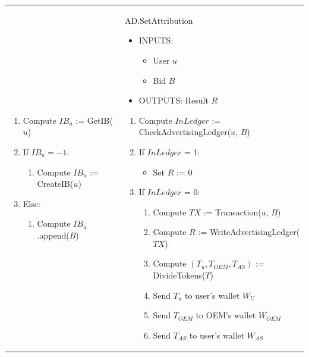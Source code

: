 \begin{table}[H]
\begin{tabular}{|p{}p{}|}
\begin{enumerate}
\begin{enumerate}
		\item Compute $IB_u$ := \textsf{GetIB}($u$)
		\item If $IB_u = -1$: 
		\begin{enumerate}
			\item Compute $IB_u$ := \textsf{CreateIB}($u$)
		\end{enumerate}
		\item Else:
		\begin{enumerate}
		 \item Compute $IB_u$.\textsf{append}($B$)
		\end{enumerate}
	\end{enumerate}
\end{enumerate} & \vspace{0.1cm} \textsf{AD.SetAttribution}
\begin{itemize}
	\vspace{-0.3cm}
	\item INPUTS:
	\vspace{-0.4cm}
	\begin{itemize}
		\item User $u$
		\item Bid $B$
	\end{itemize}
	\item OUTPUTS: Result $R$
\end{itemize}
\begin{enumerate}
	\item Compute $InLedger$ := \textsf{CheckAdvertisingLedger}($u$, $B$)
	\item If $InLedger$ = 1:
	\begin{itemize}
		\item Set $R$ := 0
	\end{itemize}
	\item If $InLedger$ = 0:
	\begin{enumerate}
		\item Compute $TX$ := \textsf{Transaction}($u$, $B$)
		\item Compute $R$ := \textsf{WriteAdvertisingLedger}($TX$)
		\item Compute $(T_u, T_{OEM}, T_{AS})$ := \textsf{DivideTokens}($T$)
		\item Send $T_u$ to user's wallet $W_U$
		\item Send $T_{OEM}$ to OEM's wallet $W_{OEM}$
		\item Send $T_{AS}$ to user's wallet $W_{AS}$
	\end{enumerate}
\end{enumerate} \\

\end{tabular}
\end{table}
